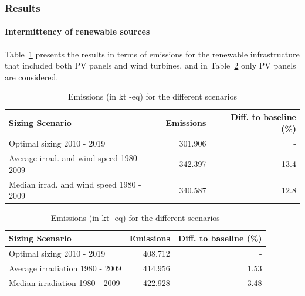 \subsubsection{Results}

\paragraph{Intermittency of renewable sources}


Table~\ref{tab:co2_10y} presents the results in terms of  emissions for the renewable infrastructure that included both PV panels and wind turbines, and in Table~\ref{tab:co2_10y_pv_only} only PV panels are considered.


\begin{table}
  \caption{Emissions (in kt -eq) for the different scenarios} \centering
    \label{tab:co2_10y}
      \begin{tabular}{|l|r|r|}        
        \hline        
        \textbf{Sizing Scenario} &  \textbf{Emissions } & \textbf{Diff. to baseline (\%) } \\
        \hline        
        Optimal sizing 2010 - 2019  &       301.906 & - \\
        \hline     
        Average irrad. and wind speed  1980 - 2009  &      342.397 &  13.4 \\
        \hline
        Median irrad. and wind speed  1980 - 2009  &      340.587 & 12.8 \\
        \hline        
      \end{tabular}      
    \end{table}



 \begin{table}     
  \caption{Emissions (in kt -eq) for the different scenarios} \centering

   \label{tab:co2_10y_pv_only}
  
      \begin{tabular}{|l|r|r|}        
        \hline
        \textbf{Sizing Scenario} &  \textbf{Emissions } & \textbf{Diff. to baseline (\%) } \\
       \hline        
        Optimal sizing 2010 - 2019  &       408.712 & - \\
        \hline     
        Average irradiation 1980 - 2009  &      414.956 &  1.53 \\
        \hline
        Median irradiation  1980 - 2009  &      422.928 & 3.48 \\
        \hline        
      \end{tabular}      
    \end{table}

